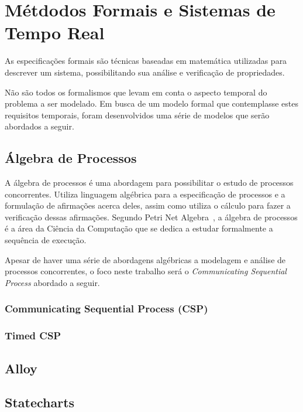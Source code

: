 \section{Métdodos Formais e Sistemas de Tempo Real}
\label{sec:MFeSTR}
As especificações formais são técnicas baseadas em matemática utilizadas para descrever um sistema,
possibilitando sua análise e verificação de propriedades.

Não são todos os formalismos que levam em conta o aspecto temporal do problema a ser modelado.
Em busca de um modelo formal que contemplasse estes requisitos temporais, foram desenvolvidos uma série
de modelos que serão abordados a seguir.

\subsection{Álgebra de Processos}
A álgebra de processos é uma abordagem para possibilitar o estudo de processos concorrentes. Utiliza linguagem algébrica
para a especificação de processos e a formulação de afirmações acerca deles, assim como utiliza o cálculo para fazer a
verificação dessas afirmações. Segundo Petri Net Algebra~\cite{books/daglib/0003970}, a álgebra de processos é a área da
Ciência da Computação que se dedica a estudar formalmente a sequência de execução.

Apesar de haver uma série de abordagens algébricas a modelagem e análise de processos concorrentes, o foco neste trabalho
será o \textit{Communicating Sequential Process} abordado a seguir.

\subsubsection{Communicating Sequential Process (CSP)}


\subsubsection{Timed CSP}


\subsection{Alloy}


\subsection{Statecharts}

